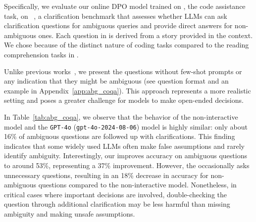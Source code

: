 Specifically, we evaluate our online DPO model trained on \codet, the code assistance task, on \ambcoqa~\cite{abg_coqa}, a clarification benchmark that assesses whether LLMs can ask clarification questions for ambiguous queries and provide direct answers for non-ambiguous ones. Each question in \ambcoqa is derived from a story provided in the context. We chose \codet because of the distinct nature of coding tasks compared to the reading comprehension tasks in \ambcoqat.

Unlike previous works~\citep{abg_coqa, learn_to_clarify}, we present the questions without few-shot prompts or any indication that they might be ambiguous (see question format and an example in Appendix~\ref{app:abg_coqa}). This approach represents a more realistic setting and poses a greater challenge for models to make open-ended decisions.

In Table~\ref{tab:abg_coqa}, we observe that the behavior of the non-interactive \llama model and the \texttt{GPT-4o} (\texttt{gpt-4o-2024-08-06}) model is highly similar: only about 16\% of ambiguous questions are followed up with clarifications. This finding indicates that some widely used LLMs often make false assumptions and rarely identify ambiguity. Interestingly, our \object improves accuracy on ambiguous questions to around 53\%, representing a 37\% improvement. However, the \object occasionally asks unnecessary questions, resulting in an 18\% decrease in accuracy for non-ambiguous questions compared to the non-interactive model. Nonetheless, in critical cases where important decisions are involved, double-checking the question through additional clarification may be less harmful than missing ambiguity and making unsafe assumptions.
